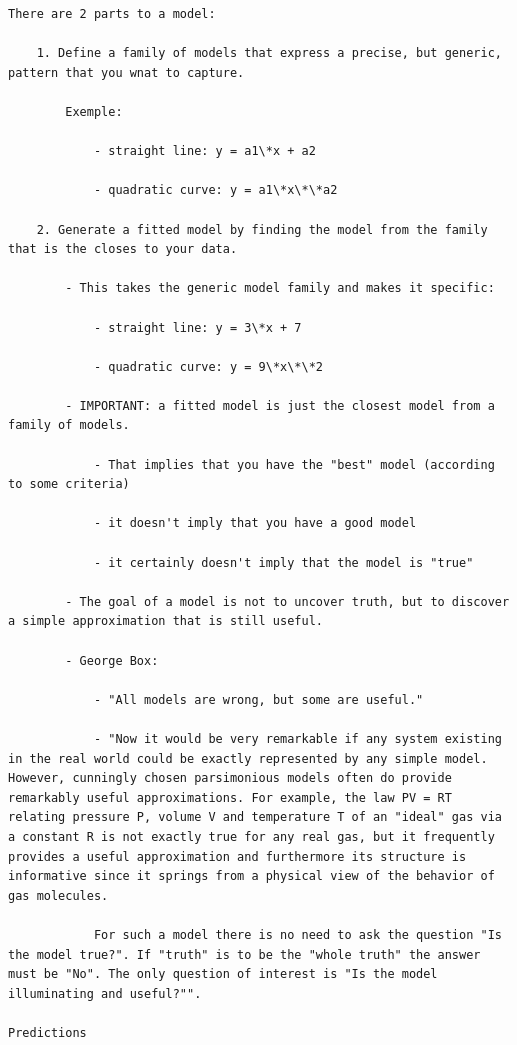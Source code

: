 \documentclass[
]{book}
\begin{document}
\begin{verbatim}
There are 2 parts to a model:

    1. Define a family of models that express a precise, but generic, pattern that you wnat to capture.

        Exemple:

            - straight line: y = a1\*x + a2

            - quadratic curve: y = a1\*x\*\*a2

    2. Generate a fitted model by finding the model from the family that is the closes to your data.

        - This takes the generic model family and makes it specific:

            - straight line: y = 3\*x + 7

            - quadratic curve: y = 9\*x\*\*2

        - IMPORTANT: a fitted model is just the closest model from a family of models.

            - That implies that you have the "best" model (according to some criteria)

            - it doesn't imply that you have a good model

            - it certainly doesn't imply that the model is "true"

        - The goal of a model is not to uncover truth, but to discover a simple approximation that is still useful.

        - George Box:

            - "All models are wrong, but some are useful."

            - "Now it would be very remarkable if any system existing in the real world could be exactly represented by any simple model. However, cunningly chosen parsimonious models often do provide remarkably useful approximations. For example, the law PV = RT relating pressure P, volume V and temperature T of an "ideal" gas via a constant R is not exactly true for any real gas, but it frequently provides a useful approximation and furthermore its structure is informative since it springs from a physical view of the behavior of gas molecules.

            For such a model there is no need to ask the question "Is the model true?". If "truth" is to be the "whole truth" the answer must be "No". The only question of interest is "Is the model illuminating and useful?"".

Predictions


\end{verbatim}
\end{document}
